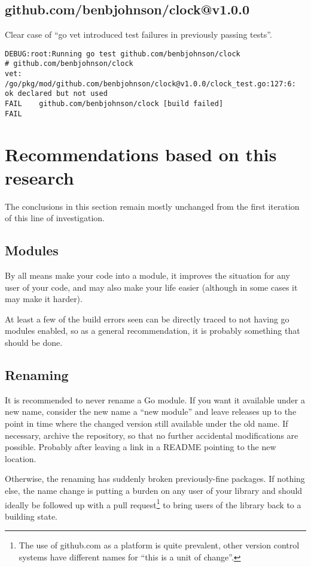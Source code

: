\documentclass[a4paper]{paper}
\begin{document}
\subsection{github.com/benbjohnson/clock@v1.0.0}

Clear case of ``go vet introduced test failures in previously passing tests''.

\begin{verbatim}
DEBUG:root:Running go test github.com/benbjohnson/clock
# github.com/benbjohnson/clock
vet: /go/pkg/mod/github.com/benbjohnson/clock@v1.0.0/clock_test.go:127:6: ok declared but not used
FAIL	github.com/benbjohnson/clock [build failed]
FAIL
\end{verbatim}

\section{Recommendations based on this research}

The conclusions in this section remain mostly unchanged from the first
iteration of this line of investigation.

\subsection{Modules}

By all means make your code into a module, it improves the situation
for any user of your code, and may also make your life easier
(although in some cases it may make it harder).

At least a few of the build errors seen can be directly traced to not
having go modules enabled, so as a general recommendation, it is
probably something that should be done.

\subsection{Renaming}
It is recommended to never rename a Go module. If you want it available
under a new name, consider the new name a ``new module'' and leave
releases up to the point in time where the changed version still
available under the old name. If necessary, archive the repository, so
that no further accidental modifications are possible. Probably after
leaving a link in a README pointing to the new location.

Otherwise, the renaming has suddenly broken previously-fine
packages. If nothing else, the name change is putting a burden on any
user of your library and should ideally be followed up with a pull
request\footnote{The use of github.com as a platform is quite
  prevalent, other version control systems have different names for
  ``this is a unit of change''.} to bring users of the library back to
a building state.
\end{document}
